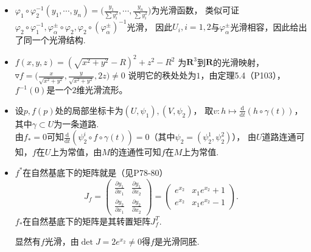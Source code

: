 \begin{itemize}
    \item[2.]
    $\varphi _1\circ \varphi_2^{-1}(y_1,\cdots, y_n)
    =\big(\frac{y_1}{\sum y_i^2},\cdots, \frac{y_n}{\sum y_i^2}\big)$为光滑函数，
    类似可证$\varphi_2\circ \varphi_1^{-1},\varphi^{\pm}_\alpha\circ\varphi_2,
    \varphi_2\circ(\varphi_\alpha^{\pm})^{-1}$光滑，
    因此$U_i,i=1,2$与$\varphi^{\pm}_\alpha$光滑相容，因此给出了同一个光滑结构.

    \item[5.]
    $f(x,y,z)=(\sqrt{x^2+y^2}-R)^2+z^2-R^2$
    为$\mathbf{R}^3$到$\mathbf{R}$的光滑映射，
    $\triangledown f=\big(\frac{x}{\sqrt{x^2+y^2}},\frac{y}{\sqrt{x^2+y^2}},2z\big)\neq0$
    说明它的秩处处为$1$，由定理5.4（P103），$f^{-1}(0)$是一个$2$维光滑流形。

    \item[7.]
    设$p,f(p)$处的局部坐标卡为$(U,\psi_1),(V,\psi_2)$，
    取$v:h\mapsto \frac{\mathrm{d}}{\mathrm{d}t}(h\circ \gamma(t))$，其中$\gamma\subset U$为一条道路.\\
    由$f_*=0$可知$\frac{\mathrm{d}}{\mathrm{d}t}(\psi_2^i\circ f \circ \gamma(t))=0$（其中$\psi_2=(\psi_2^1,\psi_2^2)$），
    由$U$道路连通可知，$f$在$U$上为常值，由$M$的连通性可知$f$在$M$上为常值.

    \item[9.]
    $f^*$在自然基底下的矩阵就是（见P78-80）
    \[ 
        J_f=\left(
        \begin{matrix}
            \frac{\partial y_1}{\partial x_1} & \frac{\partial y_1}{\partial x_2}\\
            \frac{\partial y_2}{\partial x_1} & \frac{\partial y_2}{\partial x_2}
        \end{matrix}
        \right)
        =
        \left(
        \begin{matrix}
            e^{x_2} & x_1e^{x_2}+1\\
            e^{x_2} & x_1e^{x_2}-1
        \end{matrix}
        \right).
    \]
    $f_*$在自然基底下的矩阵是其转置矩阵$J_f^T$.

    显然有$f$光滑，由$\det J=2e^{x_2}\neq0$得$f$是光滑同胚.


\end{itemize}
